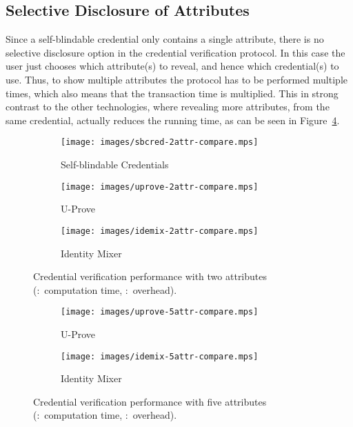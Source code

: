 \subsection{Selective Disclosure of Attributes}

Since a self-blindable credential only contains a single attribute, there is no
selective disclosure option in the credential verification protocol. In this
case the user just chooses which attribute(s) to reveal, and hence which
credential(s) to use. Thus, to show multiple attributes the protocol has to be
performed multiple times, which also means that the transaction time is
multiplied. This in strong contrast to the other technologies, where revealing
more attributes, from the same credential, actually reduces the running time, as
can be seen in Figure~\ref{fig:2attr-comparison}.

\begin{figure}[ht]
  \centering
  \begin{subfigure}[b]{0.33\textwidth}
    \texttt{[image: images/sbcred-2attr-compare.mps]}
    \caption{Self-blindable Credentials}
    \label{fig:sbcred-2attr}
  \end{subfigure}
  \begin{subfigure}[b]{0.32\textwidth}
    \texttt{[image: images/uprove-2attr-compare.mps]}
    \caption{U-Prove}
    \label{fig:uprove-2attr}
  \end{subfigure}
  \begin{subfigure}[b]{0.32\textwidth}
    \texttt{[image: images/idemix-2attr-compare.mps]}
    \caption{Identity Mixer}
    \label{fig:idemix-2attr}
  \end{subfigure}

  \caption[Credential verification performance with two attributes.]{
    Credential verification performance with two attributes
    (:~computation time,
      :~overhead).}
  \label{fig:2attr-comparison}
\end{figure}

\begin{figure}[ht]
  \centering
  \begin{subfigure}[b]{0.48\textwidth}
    \texttt{[image: images/uprove-5attr-compare.mps]}
    \caption{U-Prove}
    \label{fig:uprove-5attr}
  \end{subfigure}
  \begin{subfigure}[b]{0.48\textwidth}
    \texttt{[image: images/idemix-5attr-compare.mps]}
    \caption{Identity Mixer}
    \label{fig:idemix-5attr}
  \end{subfigure}

  \caption[Credential verification performance with five attributes.]{
    Credential verification performance with five attributes
    (:~computation time,
      :~overhead).}
  \label{fig:5attr-comparison}
\end{figure}

